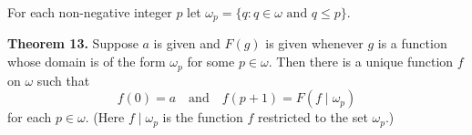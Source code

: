 For each non-negative integer $p$ let $\omega_p = \{q : q \in \omega \text{ and } q \leq p\}$.

\textbf{Theorem 13.} Suppose $a$ is given and $F(g)$ is given whenever $g$ is a function whose domain is of the form $\omega_p$ for some $p \in \omega$. Then there is a unique function $f$ on $\omega$ such that
$$f(0) = a \quad \text{and} \quad f(p+1) = F(f \mid \omega_p)$$
for each $p \in \omega$. (Here $f \mid \omega_p$ is the function $f$ restricted to the set $\omega_p$.)

